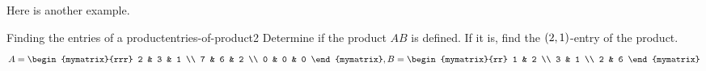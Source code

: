 Here is another example.

\begin{example}{Finding the entries of a product}{entries-of-product2}
Determine if the product $AB$ is defined. If it is, find the $\left(2, 1 \right)$-entry of the product.
\begin{equation*}
A=
\begin{mymatrix}{rrr}
2 & 3 & 1 \\
7 & 6 & 2 \\
0 & 0 & 0
\end{mymatrix},  B =\begin{mymatrix}{rr}
1 & 2 \\
3 & 1 \\
2 & 6
\end{mymatrix} 
\end{equation*}
\end{example}

